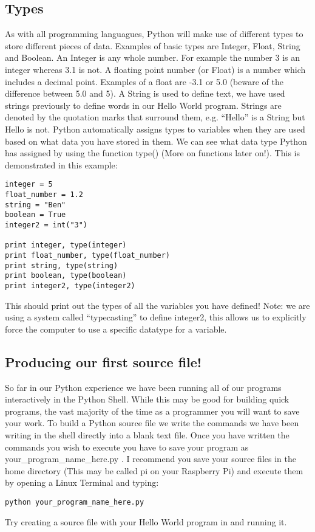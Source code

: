 \documentclass[twocolumn]{article}
\begin{document}
\subsection{Types}
As with all programming languagues, Python will make use of different types to store different pieces of data. Examples of basic types are Integer, Float, String and Boolean. An Integer is any whole number. For example the number 3 is an integer whereas 3.1 is not. A floating point number (or Float) is a number which includes a decimal point. Examples of a float are -3.1 or 5.0 (beware of the difference between 5.0 and 5). A String is used to define text, we have used strings previously to define words in our Hello World program. Strings are denoted by the quotation marks that surround them, e.g. ``Hello'' is a String but Hello is not. Python automatically assigns types to variables when they are used based on what data you have stored in them. We can see what data type Python has assigned by using the function type() (More on functions later on!). This is demonstrated in this example:
\begin{lstlisting}
integer = 5
float_number = 1.2
string = "Ben"
boolean = True
integer2 = int("3")

print integer, type(integer)
print float_number, type(float_number)
print string, type(string)
print boolean, type(boolean)
print integer2, type(integer2)
\end{lstlisting}
This should print out the types of all the variables you have defined! Note: we are using a system called ``typecasting'' to define integer2, this allows us to explicitly force the computer to use a specific datatype for a variable.
\subsection{Producing our first source file!}
So far in our Python experience we have been running all of our programs interactively in the Python Shell. While this may be good for building quick programs, the vast majority of the time as a programmer you will want to save your work. To build a Python source file we write the commands we have been writing in the shell directly into a blank text file. Once you have written the commands you wish to execute you have to save your program as your\_program\_name\_here.py . I recommend you save your source files in the home directory (This may be called pi on your Raspberry Pi) and execute them by opening a Linux Terminal and typing:
\begin{lstlisting}
python your_program_name_here.py
\end{lstlisting}
Try creating a source file with your Hello World program in and running it.
\end{document}
